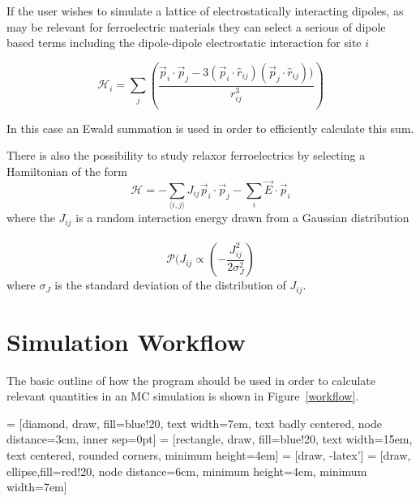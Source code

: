 \documentclass[aps,prb,twocolumn,showpacs,superscriptaddress,floatfix]{revtex4-1}
\begin{document}
If the user wishes to simulate a lattice of electrostatically interacting dipoles, as may be relevant for ferroelectric materials they can select a serious of dipole based terms including the dipole-dipole electrostatic interaction for site $i$

\begin{equation}
\mathcal{H}_i = \sum_j \left( \frac{ \vec{p}_i\cdot\vec{p}_j-3 (\vec{p}_i\cdot\hat{r}_{ij}) (\vec{p}_j\cdot\hat{r}_{ij}))}{ r_{ij}^3} \right)
\end{equation}

In this case an Ewald summation is used in order to efficiently calculate this sum.

There is also the possibility to study relaxor ferroelectrics by selecting a Hamiltonian of the form
\begin{equation}
\mathcal{H} = -\sum_{\langle i,j\rangle} J_{ij} \vec{p}_i \cdot \vec{p}_j - \sum_i\vec{E}\cdot\vec{p}_i
\end{equation}
where the $J_{ij}$ is a random interaction energy drawn from a Gaussian distribution ~\cite{Lao}
\begin{equation}
\mathcal{P}(J_{ij} \propto \left( -\frac{J_{ij}^2}{2\sigma_{J}^2} \right)
\end{equation}
where $\sigma_J$ is the standard deviation of the distribution of $J_{ij}$.

\section{Simulation Workflow}
The basic outline of how the program should be used in order to calculate relevant quantities in an MC simulation is shown in Figure~\ref{workflow}.

 = [diamond, draw, fill=blue!20, 
    text width=7em, text badly centered, node distance=3cm, inner sep=0pt]
 = [rectangle, draw, fill=blue!20, 
    text width=15em, text centered, rounded corners, minimum height=4em]
 = [draw, -latex']
 = [draw, ellipse,fill=red!20, node distance=6cm,
    minimum height=4em, minimum width=7em]
    
\end{document}
